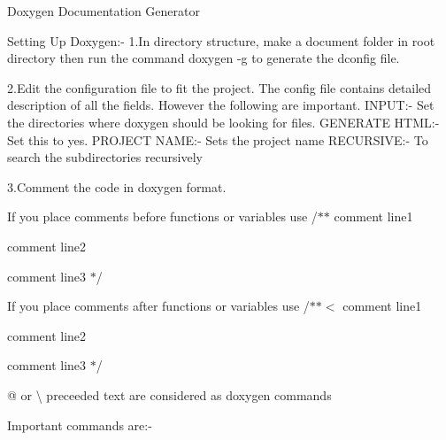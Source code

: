 Doxygen Documentation Generator

Setting Up Doxygen\+:-\/ 1.\+In directory structure, make a document folder in root directory then run the command doxygen -\/g to generate the dconfig file.

2.\+Edit the configuration file to fit the project. The config file contains detailed description of all the fields. However the following are important. I\+N\+P\+UT\+:-\/ Set the directories where doxygen should be looking for files. G\+E\+N\+E\+R\+A\+TE H\+T\+ML\+:-\/ Set this to yes. P\+R\+O\+J\+E\+CT N\+A\+ME\+:-\/ Sets the project name R\+E\+C\+U\+R\+S\+I\+VE\+:-\/ To search the subdirectories recursively

3.\+Comment the code in doxygen format.

If you place comments before functions or variables use /$\ast$$\ast$ comment line1
\begin{DoxyItemize}
\item comment line2
\item comment line3 $\ast$/
\end{DoxyItemize}

If you place comments after functions or variables use /$\ast$$\ast$$<$ comment line1
\begin{DoxyItemize}
\item comment line2
\item comment line3 $\ast$/

@ or \textbackslash{} preceeded text are considered as doxygen commands

Important commands are\+:-\/ 
\end{DoxyItemize}